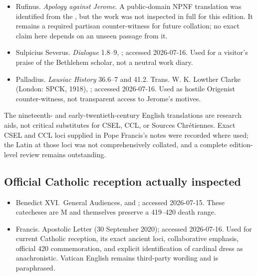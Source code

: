 \begin{itemize}
Jerome's Letter 139 for the reported 416 attack; their convergence does not
supply a complete legal dossier or neutral attribution of command.
\item Rufinus. \emph{Apology against Jerome}. A public-domain NPNF translation
was identified from the
, but
the work was not inspected in full for this edition. It remains a required
partisan counter-witness for future collation; no exact claim here depends on
an unseen passage from it.
\item Sulpicius Severus. \emph{Dialogue} 1.8--9,
; accessed 2026-07-16. Used for a visitor's praise of the Bethlehem
scholar, not a neutral work diary.
\item Palladius. \emph{Lausiac History} 36.6--7 and 41.2. Trans. W. K.
Lowther Clarke (London: SPCK, 1918),
; accessed 2026-07-16. Used as hostile Origenist counter-witness,
not transparent access to Jerome's motives.
\end{itemize}

The nineteenth- and early-twentieth-century English translations are research
aids, not critical substitutes for CSEL, CCL, or Sources Chr\'etiennes. Exact
CSEL and CCL loci supplied in Pope Francis's notes were recorded where used;
the Latin at those loci was not comprehensively collated, and a complete
edition-level review remains outstanding.

\subsection{Official Catholic reception actually inspected}

\begin{itemize}
\item Benedict XVI.\ General Audiences,
 and
; accessed 2026-07-15. These catecheses are M and themselves preserve a
419--420 death range.
\item Francis. Apostolic Letter
 (30 September 2020); accessed 2026-07-16. Used for current
Catholic reception, its exact ancient loci, collaborative emphasis, official
420 commemoration, and explicit identification of cardinal dress as
anachronistic. Vatican English remains third-party wording and is paraphrased.
\end{itemize}

